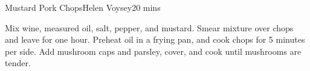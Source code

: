 \begin{recipe}{Mustard Pork Chops}{Helen Voysey}{20 mins}

  Mix wine, measured oil, salt, pepper, and mustard. Smear mixture over chops
  and leave for one hour. Preheat oil in a frying pan, and cook chops for 5
  minutes per side. Add mushroom caps and parsley, cover, and cook until
  mushrooms are tender.
\end{recipe}
